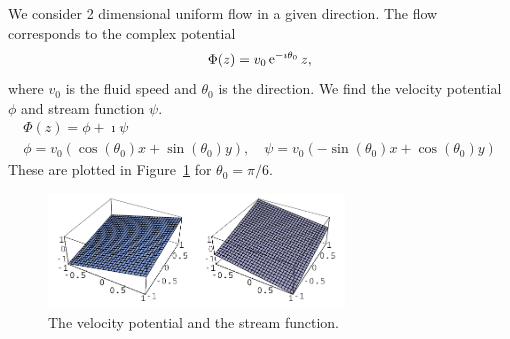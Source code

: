 \begin{Example}
  We consider 2 dimensional uniform flow in a given direction.
  The flow corresponds to the complex potential
  \[
  \Phi(z) = v_0 \mathop{\mathrm{e}}\nolimits^{- \imath \theta_0} z,
  \]
  where $v_0$ is the fluid speed and $\theta_0$ is the direction.
  We find the velocity potential $\phi$ and stream function $\psi$.
  \begin{gather*}
    \Phi(z) = \phi + \imath \psi
    \\
    \phi = v_0 ( \cos(\theta_0) x + \sin(\theta_0) y ), \quad 
    \psi = v_0 ( -\sin(\theta_0) x + \cos(\theta_0) y )
  \end{gather*}
  These are plotted in Figure~\ref{figure velocity-stream-v0eiqz} for 
  $\theta_0 = \pi / 6$.
  \begin{figure}[htb!]
    \begin{center}
      \includegraphics[width=0.7\textwidth]{fcv/analytic/velocity-stream-v0eiqz}
    \end{center}
    \caption{The velocity potential and the stream function.}
    \label{figure velocity-stream-v0eiqz}
  \end{figure}
  

\end{Example}
